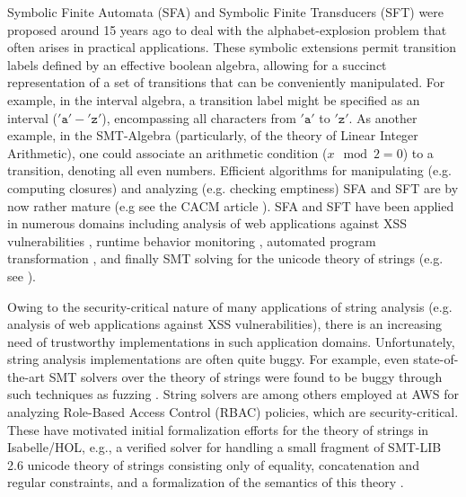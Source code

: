 Symbolic Finite Automata (SFA) and Symbolic Finite Transducers (SFT)
\cite{cav/DAntoniV17, VeanesHLMB12Transducer,DV21} were proposed around 15 years ago
to deal with the alphabet-explosion problem that often arises in practical
applications. 
%
These symbolic extensions permit transition labels defined by an effective 
boolean algebra, allowing for a succinct representation of a set of transitions
that can be conveniently manipulated. 
For example, in the interval algebra, a transition label might be specified as 
an interval ($'\texttt{a}'-'\texttt{z}'$), encompassing all characters from
$'\texttt{a}'$ to $'\texttt{z}'$. As another example, in the SMT-Algebra
(particularly, of the theory of Linear Integer Arithmetic), %
one could associate an arithmetic condition ($x \mod 2 = 0$) to a transition, 
denoting all even numbers. Efficient algorithms for manipulating (e.g. computing
closures) and analyzing (e.g. checking emptiness) SFA and SFT are by now
rather mature (e.g see the CACM article \cite{DV21}).
SFA and SFT have been applied in numerous domains including analysis of web
applications against XSS vulnerabilities \cite{VeanesHLMB12Transducer,uss/HooimeijerLMSV11},
runtime behavior monitoring \cite{osdi/YaseenABCL20}, automated program
transformation \cite{pldi/HuD17}, and finally SMT solving for the unicode theory
of strings (e.g. see \cite{pacmpl/ChenFHHHKLRW22,CHL+19}).

Owing to the security-critical nature of many applications of string analysis
(e.g. analysis of web applications against XSS vulnerabilities), there is an 
increasing need of trustworthy implementations in such application domains. 
Unfortunately, string analysis implementations are often quite buggy. For
example, even state-of-the-art SMT solvers over the theory of strings 
were found to be buggy through such techniques as fuzzing
\cite{DBLP:conf/cav/BlotskyMBZKG18,BM20,Mansur20}. 
String solvers are among others employed at AWS for analyzing Role-Based 
Access Control (RBAC) policies, which are security-critical.
These have motivated initial formalization efforts for the theory of strings in 
Isabelle/HOL, e.g., a verified solver \cite{cpp/KanLRS22}
for handling a small fragment of SMT-LIB 2.6 unicode theory of strings
consisting only of equality, concatenation and regular constraints, and a
formalization of the semantics of this theory \cite{verified-verifying}.

